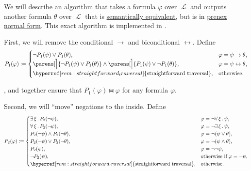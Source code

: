 \begin{algorithm}\label{alg:prenex_normal_form_conversion}
  We will describe an algorithm that takes a formula \( \varphi \) over \( \mscrL \) and outputs another formula \( \theta \) over \( \mscrL \) that is \hyperref[def:first_order_semantics/equivalence]{semantically equivalent}, but is in \hyperref[def:prenex_normal_form]{prenex normal form}. This exact algorithm is implemented in \cite{code}.

  \begin{thmenum}
     First, we will remove the conditional \( \rightarrow \) and biconditional \( \leftrightarrow \). Define
    \begin{equation*}
      P_1(\varphi) \coloneqq \begin{cases}
        \neg P_1(\psi) \vee P_1(\theta),                                                                          &\varphi = \psi \rightarrow \theta, \\
        \parens[\Big]{ \neg P_1(\psi) \vee P_1(\theta) } \wedge \parens[\Big]{ P_1(\psi) \vee \neg P_1(\theta) }, &\varphi = \psi \leftrightarrow \theta, \\
        \hyperref[rem:straightforward_traversal]{\T{straightforward traversal}},                                  &\T{otherwise.}
      \end{cases}
    \end{equation*}

    ,  and  together ensure that \( P_1(\varphi) \gleichstark \varphi \) for any formula \( \varphi \).

     Second, we will \enquote{move} negations to the inside. Define
    \begin{equation*}
      P_2(\varphi) \coloneqq \begin{cases}
        \qexists \xi P_2(\neg \psi),                                             &\varphi = \neg \qforall \xi \psi, \\
        \qforall \xi P_2(\neg \psi),                                             &\varphi = \neg \qexists \xi \psi, \\
        P_2(\neg \psi) \wedge P_2(\neg \theta),                                  &\varphi = \neg (\psi \vee \theta), \\
        P_2(\neg \psi) \vee P_2(\neg \theta),                                    &\varphi = \neg (\psi \wedge \theta), \\
        P_2(\psi),                                                               &\varphi = \neg \neg \psi, \\
        \neg P_2(\psi),                                                          &\T{otherwise if} \varphi = \neg \psi, \\
        \hyperref[rem:straightforward_traversal]{\T{straightforward traversal}}, &\T{otherwise.}
      \end{cases}
    \end{equation*}


\end{thmenum}
\end{algorithm}
